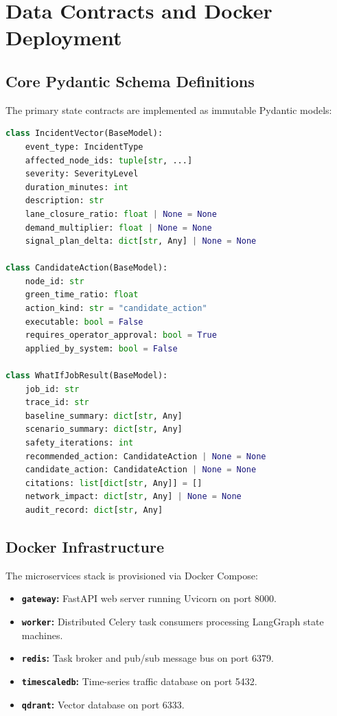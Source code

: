 \chapter{Data Contracts and Docker Deployment}
\label{appendix:schema}

\section{Core Pydantic Schema Definitions}
The primary state contracts are implemented as immutable Pydantic models:

\begin{lstlisting}[language=Python]
class IncidentVector(BaseModel):
    event_type: IncidentType
    affected_node_ids: tuple[str, ...]
    severity: SeverityLevel
    duration_minutes: int
    description: str
    lane_closure_ratio: float | None = None
    demand_multiplier: float | None = None
    signal_plan_delta: dict[str, Any] | None = None

class CandidateAction(BaseModel):
    node_id: str
    green_time_ratio: float
    action_kind: str = "candidate_action"
    executable: bool = False
    requires_operator_approval: bool = True
    applied_by_system: bool = False

class WhatIfJobResult(BaseModel):
    job_id: str
    trace_id: str
    baseline_summary: dict[str, Any]
    scenario_summary: dict[str, Any]
    safety_iterations: int
    recommended_action: CandidateAction | None = None
    candidate_action: CandidateAction | None = None
    citations: list[dict[str, Any]] = []
    network_impact: dict[str, Any] | None = None
    audit_record: dict[str, Any]
\end{lstlisting}

\section{Docker Infrastructure}
The microservices stack is provisioned via Docker Compose:
\begin{itemize}[leftmargin=1.5cm, label=$\bullet$]
  \item \textbf{\texttt{gateway}:} FastAPI web server running Uvicorn on port 8000.
  \item \textbf{\texttt{worker}:} Distributed Celery task consumers processing LangGraph state machines.
  \item \textbf{\texttt{redis}:} Task broker and pub/sub message bus on port 6379.
  \item \textbf{\texttt{timescaledb}:} Time-series traffic database on port 5432.
  \item \textbf{\texttt{qdrant}:} Vector database on port 6333.
\end{itemize}
